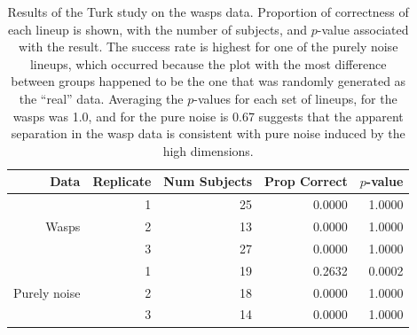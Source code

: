 



\begin{table}[ht]
\begin{center}
\caption{Results of the Turk study on the wasps data. Proportion of correctness of each lineup is shown, with the number of subjects, and $p$-value associated with the result. The success rate is highest for one of the purely noise lineups, which occurred because the plot with the most difference between groups happened to be the one that was randomly generated as the ``real'' data. Averaging the $p$-values for each set of lineups, for the wasps was 1.0, and for the pure noise is 0.67 suggests that the apparent separation in the wasp data is consistent with pure noise induced by the high dimensions.}
\vspace{0.15cm}
\begin{tabular}{r|r|r|rr}
\hline
  \hline
 Data & Replicate & Num Subjects & Prop Correct & $p$-value\\ 
  \hline
  & 1 & 25 & 0.0000 &  1.0000\\
Wasps & 2 & 13 & 0.0000 &  1.0000\\ 
 & 3 & 27 & 0.0000 &  1.0000\\
 \hline
 & 1 & 19 & 0.2632 &  0.0002\\
Purely noise & 2 & 18 & 0.0000 &  1.0000 \\ 
 & 3 & 14 & 0.0000 &  1.0000\\
   \hline
\end{tabular}
\label{wasp}
\end{center}
\end{table}

